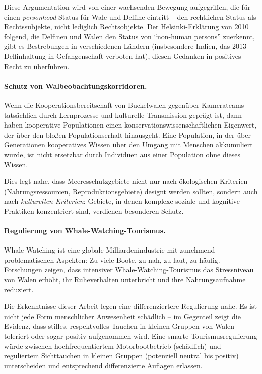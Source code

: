 ﻿\documentclass[12pt,a4paper]{article}
\theoremstyle{definition}
\theoremstyle{remark}
\begin{document}
Diese Argumentation wird von einer wachsenden Bewegung aufgegriffen, die für einen \emph{personhood}-Status für Wale und Delfine eintritt -- den rechtlichen Status als Rechtssubjekte, nicht lediglich Rechtsobjekte. Der Helsinki-Erklärung von 2010 folgend, die Delfinen und Walen den Status von ``non-human persons'' zuerkennt, gibt es Bestrebungen in verschiedenen Ländern (insbesondere Indien, das 2013 Delfinhaltung in Gefangenschaft verboten hat), diesen Gedanken in positives Recht zu überführen.

\paragraph{Schutz von Walbeobachtungskorridoren.}
Wenn die Kooperationsbereitschaft von Buckelwalen gegenüber Kamerateams tatsächlich durch Lernprozesse und kulturelle Transmission geprägt ist, dann haben kooperative Populationen einen konservationswissenschaftlichen Eigenwert, der über den bloßen Populationserhalt hinausgeht. Eine Population, in der über Generationen kooperatives Wissen über den Umgang mit Menschen akkumuliert wurde, ist nicht ersetzbar durch Individuen aus einer Population ohne dieses Wissen.

Dies legt nahe, dass Meeresschutzgebiete nicht nur nach ökologischen Kriterien (Nahrungsressourcen, Reproduktionsgebiete) designt werden sollten, sondern auch nach \emph{kulturellen Kriterien}: Gebiete, in denen komplexe soziale und kognitive Praktiken konzentriert sind, verdienen besonderen Schutz.

\paragraph{Regulierung von Whale-Watching-Tourismus.}
Whale-Watching ist eine globale Milliardenindustrie mit zunehmend problematischen Aspekten: Zu viele Boote, zu nah, zu laut, zu häufig. Forschungen zeigen, dass intensiver Whale-Watching-Tourismus das Stressniveau von Walen erhöht, ihr Ruheverhalten unterbricht und ihre Nahrungsaufnahme reduziert.

Die Erkenntnisse dieser Arbeit legen eine differenziertere Regulierung nahe. Es ist nicht jede Form menschlicher Anwesenheit schädlich -- im Gegenteil zeigt die Evidenz, dass stilles, respektvolles Tauchen in kleinen Gruppen von Walen toleriert oder sogar positiv aufgenommen wird. Eine smarte Tourismusregulierung würde zwischen hochfrequentiertem Motorbootbetrieb (schädlich) und reguliertem Sichttauchen in kleinen Gruppen (potenziell neutral bis positiv) unterscheiden und entsprechend differenzierte Auflagen erlassen.
\end{document}
